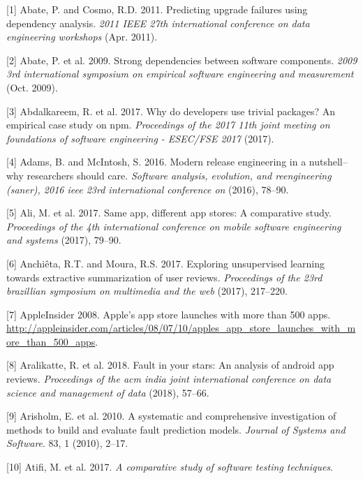 \documentclass[]{book}
\begin{document}
\hypertarget{refs}{}
\hypertarget{ref-Abate2011}{}
{[}1{]} Abate, P. and Cosmo, R.D. 2011. Predicting upgrade failures
using dependency analysis. \emph{2011 IEEE 27th international conference
on data engineering workshops} (Apr. 2011).

\hypertarget{ref-Abate2009}{}
{[}2{]} Abate, P. et al. 2009. Strong dependencies between software
components. \emph{2009 3rd international symposium on empirical software
engineering and measurement} (Oct. 2009).

\hypertarget{ref-Abdalkareem2017}{}
{[}3{]} Abdalkareem, R. et al. 2017. Why do developers use trivial
packages? An empirical case study on npm. \emph{Proceedings of the 2017
11th joint meeting on foundations of software engineering - ESEC/FSE
2017} (2017).

\hypertarget{ref-adams2016a}{}
{[}4{]} Adams, B. and McIntosh, S. 2016. Modern release engineering in a
nutshell--why researchers should care. \emph{Software analysis,
evolution, and reengineering (saner), 2016 ieee 23rd international
conference on} (2016), 78--90.

\hypertarget{ref-ali2017same}{}
{[}5{]} Ali, M. et al. 2017. Same app, different app stores: A
comparative study. \emph{Proceedings of the 4th international conference
on mobile software engineering and systems} (2017), 79--90.

\hypertarget{ref-anchieta2017}{}
{[}6{]} Anchiêta, R.T. and Moura, R.S. 2017. Exploring unsupervised
learning towards extractive summarization of user reviews.
\emph{Proceedings of the 23rd brazillian symposium on multimedia and the
web} (2017), 217--220.

\hypertarget{ref-appStoreLaunch}{}
{[}7{]} AppleInsider 2008. Apple's app store launches with more than 500
apps.
\url{http://appleinsider.com/articles/08/07/10/apples_app_store_launches_with_more_than_500_apps}.

\hypertarget{ref-aralikatte2018fault}{}
{[}8{]} Aralikatte, R. et al. 2018. Fault in your stars: An analysis of
android app reviews. \emph{Proceedings of the acm india joint
international conference on data science and management of data} (2018),
57--66.

\hypertarget{ref-Arisholm2010}{}
{[}9{]} Arisholm, E. et al. 2010. A systematic and comprehensive
investigation of methods to build and evaluate fault prediction models.
\emph{Journal of Systems and Software}. 83, 1 (2010), 2--17.

\hypertarget{ref-atifi2017}{}
{[}10{]} Atifi, M. et al. 2017. \emph{A comparative study of software
testing techniques}.
\end{document}

